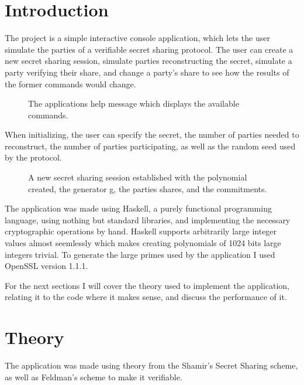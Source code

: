 \documentclass[a4paper,oneside,12pt,final]{article}
\begin{document}
 


\newpage

\section{Introduction} 

The project is a simple interactive console application, which lets the user
simulate the parties of a verifiable secret sharing protocol. The user can
create a new secret sharing session, simulate parties reconstructing the secret,
simulate a party verifying their share, and change a party's share to see how
the results of the former commands would change.

\begin{figure}[h]
\label{fig:help}
\center
\caption{The applications help message which displays the available commands.}
\end{figure}

When initializing, the user can specify the secret, the number of parties needed
to reconstruct, the number of parties participating, as well as the random seed
used by the protocol.

\begin{figure}[h]
\label{fig:initialize-secret-sharing}
\center
\caption{A new secret sharing session established with the polynomial created, 
         the generator g, the parties shares, and the commitments.}
\end{figure}

The application was made using Haskell, a purely functional programming
language, using nothing but standard libraries, and implementing the necessary
cryptographic operations by hand. Haskell supports arbitrarily large integer
values almost seemlessly which makes creating polynomials of 1024 bits large
integers trivial. To generate the large primes used by the application I used
OpenSSL version 1.1.1.

For the next sections I will cover the theory used to implement the application,
relating it to the code where it makes sense, and discuss the performance of it.

\section{Theory}

The application was made using theory from the Shamir's Secret Sharing
scheme, as well as Feldman's scheme to make it verifiable. 
\end{document}
